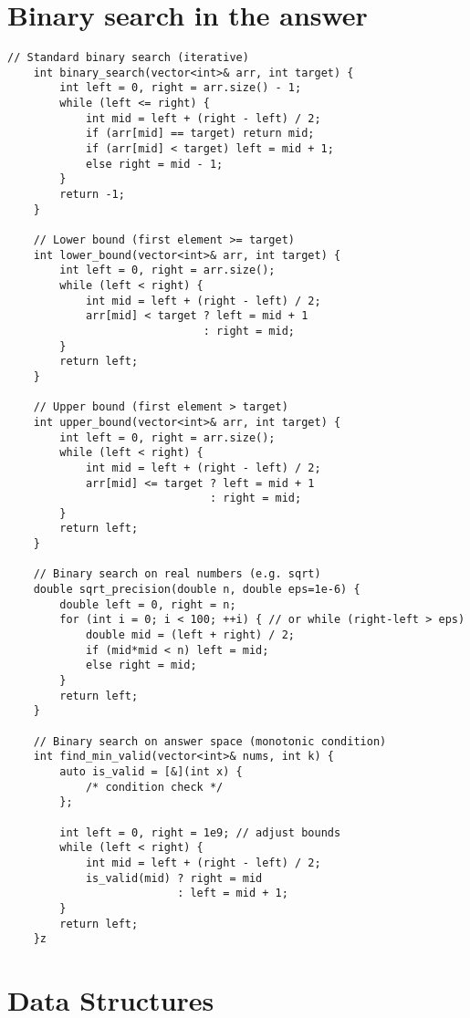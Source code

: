\documentclass[10pt]{article}
\begin{document}
\begin{multicols*}{2}
\section{Binary search in the answer}
\begin{lstlisting}[style=compactcpp]
    // Standard binary search (iterative)
    int binary_search(vector<int>& arr, int target) {
        int left = 0, right = arr.size() - 1;
        while (left <= right) {
            int mid = left + (right - left) / 2;
            if (arr[mid] == target) return mid;
            if (arr[mid] < target) left = mid + 1;
            else right = mid - 1;
        }
        return -1;
    }
    
    // Lower bound (first element >= target)
    int lower_bound(vector<int>& arr, int target) {
        int left = 0, right = arr.size();
        while (left < right) {
            int mid = left + (right - left) / 2;
            arr[mid] < target ? left = mid + 1 
                              : right = mid;
        }
        return left;
    }
    
    // Upper bound (first element > target)
    int upper_bound(vector<int>& arr, int target) {
        int left = 0, right = arr.size();
        while (left < right) {
            int mid = left + (right - left) / 2;
            arr[mid] <= target ? left = mid + 1 
                               : right = mid;
        }
        return left;
    }
    
    // Binary search on real numbers (e.g. sqrt)
    double sqrt_precision(double n, double eps=1e-6) {
        double left = 0, right = n;
        for (int i = 0; i < 100; ++i) { // or while (right-left > eps)
            double mid = (left + right) / 2;
            if (mid*mid < n) left = mid;
            else right = mid;
        }
        return left;
    }
    
    // Binary search on answer space (monotonic condition)
    int find_min_valid(vector<int>& nums, int k) {
        auto is_valid = [&](int x) { 
            /* condition check */ 
        };
        
        int left = 0, right = 1e9; // adjust bounds
        while (left < right) {
            int mid = left + (right - left) / 2;
            is_valid(mid) ? right = mid 
                          : left = mid + 1;
        }
        return left;
    }z
\end{lstlisting}
\section{Data Structures}

\end{multicols*}
\end{document}
